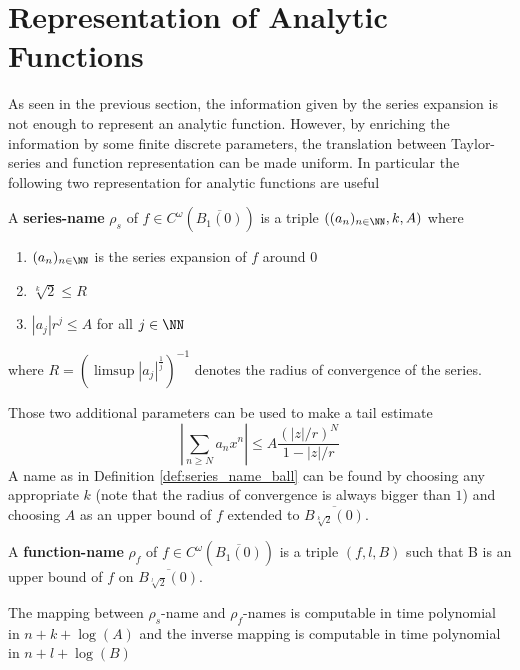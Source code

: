 	\section{Representation of Analytic Functions}
	 As seen in the previous section, the information given by the series expansion is not enough to represent an analytic function.
	 However, by enriching the information by some finite discrete parameters, the translation between Taylor-series and function representation can be made uniform.
	 In particular the following two representation for analytic functions are useful
	 \begin{definition}\label{def:series_name_ball}
	 	A \textbf{series-name} $\rho_s$ of $f \in C^\omega(\overline{B_1(0)})$ is a triple $((a_n)_{n \in \NN}, k, A)$ where 
	 	\begin{enumerate}
	 		\item $(a_n)_{n \in \NN}$ is the series expansion of $f$ around $0$
	 		\item $\sqrt[k]{2} \leq R$ 
	 		\item $|a_j|r^j \leq A$ for all $j \in \NN$
	 	\end{enumerate}
	 	where $R = (\limsup |a_j|^{\frac{1}{j}})^{-1}$ denotes the radius of convergence of the series.
	 \end{definition}
	 Those two additional parameters can be used to make a tail estimate 
	 \begin{equation}\label{eqn:tail_estimate}
	  \left | \sum_{n \geq N} a_nx^n \right | \leq A \frac{(|z|/r)^N}{1-|z|/r}
	 \end{equation}
	 A name as in Definition \ref{def:series_name_ball} can be found by choosing any appropriate $k$ (note that the radius of convergence is always bigger than $1$) and choosing $A$ as an upper bound of $f$ extended to $\overline{B_{\sqrt[k]{2}}(0)}$. 
	 \begin{definition}
	 	A \textbf{function-name} $\rho_f$ of $f \in C^\omega(\overline{B_1(0)})$ is a triple $(f, l, B)$ such that
		B is an upper bound of $f$ on $\overline{B_{\sqrt[l]{2}}(0)}$.
	 \end{definition}
	 \begin{theorem}\cite{Kaw}\label{thm:representation_conversion}
	 	The mapping between $\rho_s$-name and $\rho_f$-names is computable in time polynomial in 
	 	$n+k+\log(A)$ and the inverse mapping is computable in time polynomial in $n+l+\log(B)$ 
	 \end{theorem}
